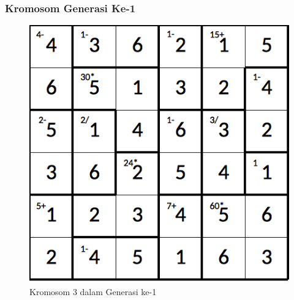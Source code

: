 \documentclass{beamer}
\begin{document}
\note{

}

\begin{frame}
\frametitle{Kromosom Generasi Ke-1}
\begin{figure}
\centering
\captionsetup{justification=centering}
\includegraphics[scale=0.333]{Gambar/hybridgenetic/Generation1Chromosome3}
\caption[Kromosom 3 dalam Generasi ke-1]{Kromosom 3 dalam Generasi ke-1}
\label{fig:analisisg1k3}
\end{figure}
\end{frame}

\note{

}
\end{document}
